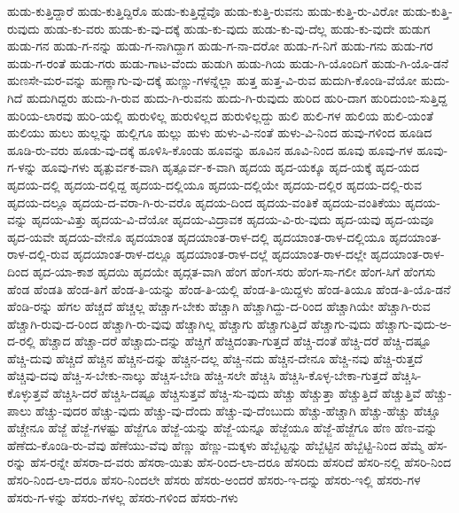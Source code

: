 {ಹುಡು-ಕುತ್ತಿದ್ದಾರೆ
ಹುಡು-ಕುತ್ತಿದ್ದಿರೊ
ಹುಡು-ಕುತ್ತಿದ್ದೆವೊ
ಹುಡು-ಕುತ್ತಿ-ರುವನು
ಹುಡು-ಕುತ್ತಿ-ರು-ವಿರೋ
ಹುಡು-ಕುತ್ತಿ-ರುವುದು
ಹುಡು-ಕು-ವರು
ಹುಡು-ಕು-ವು-ದಕ್ಕೆ
ಹುಡು-ಕು-ವುದು
ಹುಡು-ಕು-ವು-ದೆಲ್ಲ
ಹುಡು-ಕು-ವುದೇ
ಹುಡುಗ
ಹುಡು-ಗನ
ಹುಡು-ಗ-ನನ್ನು
ಹುಡು-ಗ-ನಾಗಿದ್ದಾಗ
ಹುಡು-ಗ-ನಾ-ದರೋ
ಹುಡು-ಗ-ನಿಗೆ
ಹುಡು-ಗನು
ಹುಡು-ಗರ
ಹುಡು-ಗ-ರಂತೆ
ಹುಡು-ಗರು
ಹುಡು-ಗಾಟ-ವೆಂದು
ಹುಡುಗಿ
ಹುಡು-ಗಿಯ
ಹುಡು-ಗಿ-ಯೊಂದಿಗೆ
ಹುಡು-ಗಿ-ಯೊ-ಡನೆ
ಹುಣಸೇ-ಮರ-ವನ್ನು
ಹುಣ್ಣಾಗು-ವು-ದಕ್ಕೆ
ಹುಣ್ಣು-ಗಳನ್ನೆಲ್ಲಾ
ಹುತ್ತ
ಹುತ್ತ-ವಿ-ರುವ
ಹುದುಗಿ-ಕೊಂಡಿ-ವೆಯೋ
ಹುದು-ಗಿದೆ
ಹುದುಗಿದ್ದರು
ಹುದು-ಗಿ-ರುವ
ಹುದು-ಗಿ-ರುವನು
ಹುದು-ಗಿ-ರುವುದು
ಹುರಿದ
ಹುರಿ-ದಾಗ
ಹುರಿದುಂಬಿ-ಸುತ್ತಿದ್ದ
ಹುರಿಯ-ಲಾರವು
ಹುರಿ-ಯಲ್ಲಿ
ಹುರುಳಿಲ್ಲ
ಹುರುಳಿಲ್ಲದ
ಹುರುಳಿಲ್ಲದ್ದು
ಹುಲಿ
ಹುಲಿ-ಗಳ
ಹುಲಿಯ
ಹುಲಿ-ಯಂತೆ
ಹುಲಿಯು
ಹುಲು
ಹುಲ್ಲನ್ನು
ಹುಲ್ಲಿಗೂ
ಹುಲ್ಲು
ಹುಳು
ಹುಳು-ವಿ-ನಂತೆ
ಹುಳು-ವಿ-ನಿಂದ
ಹುವು-ಗಳಿಂದ
ಹೂಡಿದ
ಹೂಡಿ-ರು-ವರು
ಹೂಡು-ವು-ದಕ್ಕೆ
ಹೂಳಿಸಿ-ಕೊಂಡು
ಹೂವನ್ನು
ಹೂವಿನ
ಹೂವಿ-ನಿಂದ
ಹೂವು
ಹೂವು-ಗಳ
ಹೂವು-ಗ-ಳನ್ನು
ಹೂವು-ಗಳು
ಹೃತ್ಪುರ್ವಕ-ವಾಗಿ
ಹೃತ್ಪೂರ್ವ-ಕ-ವಾಗಿ
ಹೃದಯ
ಹೃದ-ಯಕ್ಕೂ
ಹೃದ-ಯಕ್ಕೆ
ಹೃದ-ಯದ
ಹೃದಯ-ದಲ್ಲಿ
ಹೃದಯ-ದಲ್ಲಿದ್ದ
ಹೃದಯ-ದಲ್ಲಿಯೂ
ಹೃದಯ-ದಲ್ಲಿಯೇ
ಹೃದಯ-ದಲ್ಲಿರ
ಹೃದಯ-ದಲ್ಲಿ-ರುವ
ಹೃದಯ-ದಲ್ಲೂ
ಹೃದಯ-ದ-ವರಾ-ಗಿ-ರು-ವರೊ
ಹೃದಯ-ದಿಂದ
ಹೃದಯ-ವಂತಿಕೆ
ಹೃದಯ-ವಂತಿಕೆಯು
ಹೃದಯ-ವನ್ನು
ಹೃದಯ-ವಿತ್ತು
ಹೃದಯ-ವಿ-ದೆಯೋ
ಹೃದಯ-ವಿದ್ರಾವಕ
ಹೃದಯ-ವಿ-ರು-ವುದು
ಹೃದ-ಯವು
ಹೃದ-ಯವೂ
ಹೃದ-ಯವೇ
ಹೃದಯ-ವೇನೊ
ಹೃದಯಾಂತ
ಹೃದಯಾಂತ-ರಾಳ-ದಲ್ಲಿ
ಹೃದಯಾಂತ-ರಾಳ-ದಲ್ಲಿಯೂ
ಹೃದಯಾಂತ-ರಾಳ-ದಲ್ಲಿ-ರುವ
ಹೃದಯಾಂತ-ರಾಳ-ದಲ್ಲೂ
ಹೃದಯಾಂತ-ರಾಳ-ದಲ್ಲೆ
ಹೃದಯಾಂತ-ರಾಳ-ದಲ್ಲೇ
ಹೃದಯಾಂತ-ರಾಳ-ದಿಂದ
ಹೃದ-ಯಾ-ಕಾಶ
ಹೃದಯಿ
ಹೃದಯೇ
ಹೃದ್ಗತ-ವಾಗಿ
ಹೆಂಗ
ಹೆಂಗ-ಸರು
ಹೆಂಗ-ಸಾ-ಗಲೀ
ಹೆಂಗ-ಸಿಗೆ
ಹೆಂಗಸು
ಹೆಂಡ
ಹೆಂಡತಿ
ಹೆಂಡ-ತಿಗೆ
ಹೆಂಡ-ತಿ-ಯನ್ನು
ಹೆಂಡ-ತಿ-ಯಲ್ಲಿ
ಹೆಂಡ-ತಿ-ಯಿದ್ದಳು
ಹೆಂಡ-ತಿಯೂ
ಹೆಂಡ-ತಿ-ಯೊ-ಡನೆ
ಹೆಂಡಿ-ರನ್ನು
ಹೆಗಲ
ಹೆಚ್ಚದೆ
ಹೆಚ್ಚಲ್ಲ
ಹೆಚ್ಚಾಗ-ಬೇಕು
ಹೆಚ್ಚಾಗಿ
ಹೆಚ್ಚಾಗಿದ್ದು-ದ-ರಿಂದ
ಹೆಚ್ಚಾಗಿಯೇ
ಹೆಚ್ಚಾಗಿ-ರುವ
ಹೆಚ್ಚಾಗಿ-ರುವು-ದ-ರಿಂದ
ಹೆಚ್ಚಾಗಿ-ರು-ವುವು
ಹೆಚ್ಚಾಗಿಲ್ಲ
ಹೆಚ್ಚಾಗು
ಹೆಚ್ಚಾಗುತ್ತಿದೆ
ಹೆಚ್ಚಾಗು-ವುದು
ಹೆಚ್ಚಾಗು-ವುದು-ಅ-ದ-ರಲ್ಲಿ
ಹೆಚ್ಚಾದ
ಹೆಚ್ಚಾ-ದರೆ
ಹೆಚ್ಚಾದು-ದನ್ನು
ಹೆಚ್ಚಿಗೆ
ಹೆಚ್ಚಿದಂತಾ-ಗುತ್ತದೆ
ಹೆಚ್ಚಿ-ದಂತೆ
ಹೆಚ್ಚಿ-ದರೆ
ಹೆಚ್ಚಿ-ದಷ್ಟೂ
ಹೆಚ್ಚಿ-ದುವು
ಹೆಚ್ಚಿದೆ
ಹೆಚ್ಚಿನ
ಹೆಚ್ಚಿನ-ದನ್ನು
ಹೆಚ್ಚಿನ-ದಲ್ಲ
ಹೆಚ್ಚಿ-ನದು
ಹೆಚ್ಚಿನ-ದೇನೂ
ಹೆಚ್ಚಿ-ನವು
ಹೆಚ್ಚಿ-ರುತ್ತದೆ
ಹೆಚ್ಚಿವು-ದವು
ಹೆಚ್ಚಿ-ಸ-ಬೇಕು-ನಾಲ್ಕು
ಹೆಚ್ಚಿಸ-ಬೇಡಿ
ಹೆಚ್ಚಿ-ಸಲೇ
ಹೆಚ್ಚಿಸಿ
ಹೆಚ್ಚಿಸಿ-ಕೊಳ್ಳ-ಬೇಕಾ-ಗುತ್ತದೆ
ಹೆಚ್ಚಿಸಿ-ಕೊಳ್ಳುತ್ತವೆ
ಹೆಚ್ಚಿಸಿ-ದರೆ
ಹೆಚ್ಚಿಸಿ-ದಷ್ಟೂ
ಹೆಚ್ಚಿಸುತ್ತವೆ
ಹೆಚ್ಚಿ-ಸು-ವುದು
ಹೆಚ್ಚು
ಹೆಚ್ಚುತ್ತಾ
ಹೆಚ್ಚುತ್ತಿದೆ
ಹೆಚ್ಚುತ್ತಿವೆ
ಹೆಚ್ಚು-ಪಾಲು
ಹೆಚ್ಚು-ವುದರ
ಹೆಚ್ಚು-ವುದು
ಹೆಚ್ಚು-ವು-ದೆಂದು
ಹೆಚ್ಚು-ವು-ದೆಂಬುದು
ಹೆಚ್ಚು-ಹೆಚ್ಚಾಗಿ
ಹೆಚ್ಚು-ಹೆಚ್ಚು
ಹೆಚ್ಚೂ
ಹೆಚ್ಚೇನೂ
ಹೆಜ್ಜೆ
ಹೆಜ್ಜೆ-ಗಳಷ್ಟು
ಹೆಜ್ಜೆಗೂ
ಹೆಜ್ಜೆ-ಯನ್ನು
ಹೆಜ್ಜೆ-ಯನ್ನೂ
ಹೆಜ್ಜೆಯೂ
ಹೆಜ್ಜೆ-ಹೆಜ್ಜೆಗೂ
ಹೆಣ
ಹೆಣ-ವನ್ನು
ಹೆಣೆದು-ಕೊಂಡಿ-ರು-ವೆವು
ಹೆಣೆಯು-ವೆವು
ಹೆಣ್ಣು
ಹೆಣ್ಣು-ಮಕ್ಕಳು
ಹೆಬ್ಬೆಟ್ಟನ್ನು
ಹೆಬ್ಬೆಟ್ಟಿನ
ಹೆಬ್ಬೆಟ್ಟಿ-ನಿಂದ
ಹೆಮ್ಮೆ
ಹೆಸ-ರನ್ನು
ಹೆಸ-ರನ್ನೇ
ಹೆಸರಾ-ದ-ವರು
ಹೆಸರಾ-ಯಿತು
ಹೆಸ-ರಿಂದ-ಲಾ-ದರೂ
ಹೆಸರಿದು
ಹೆಸರಿದೆ
ಹೆಸರಿ-ನಲ್ಲಿ
ಹೆಸರಿ-ನಿಂದ
ಹೆಸರಿ-ನಿಂದ-ಲಾ-ದರೂ
ಹೆಸರಿ-ನಿಂದಲೇ
ಹೆಸರು
ಹೆಸರು-ಅಂದರೆ
ಹೆಸರು-ಇ-ದನ್ನು
ಹೆಸರು-ಇಲ್ಲಿ
ಹೆಸರು-ಗಳ
ಹೆಸರು-ಗ-ಳನ್ನು
ಹೆಸರು-ಗಳಲ್ಲ
ಹೆಸರು-ಗಳಿಂದ
ಹೆಸರು-ಗಳು
}
